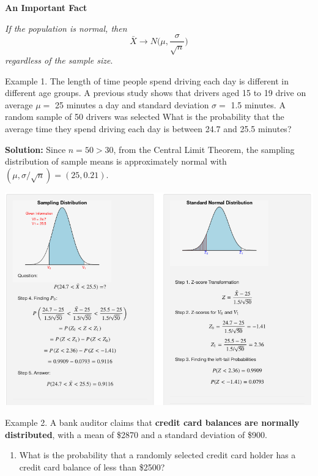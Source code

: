\documentclass[
]{book}
\providecommand{\tightlist}{%
  \setlength{\itemsep}{0pt}\setlength{\parskip}{0pt}}
\begin{document}
\hfill\break

\textbf{An Important Fact}

\emph{If the population is normal, then}
\[
\bar{X} \to N \big(\mu, \frac{\sigma}{\sqrt{n}} \big)
\]
\emph{regardless of the sample size}.

\hfill\break

Example 1. The length of time people spend driving each day is different in different age groups. A previous study shows that drivers aged 15 to 19 drive on average \(\mu =\) 25 minutes a day and standard deviation \(\sigma =\) 1.5 minutes. A random sample of 50 drivers was selected What is the probability that the average time they spend driving each day is between 24.7 and 25.5 minutes?

\textbf{Solution:} Since \(n = 50 > 30\), from the Central Limit Theorem, the sampling distribution of sample means is approximately normal with \((\mu, \sigma/\sqrt{n}) = (25, 0.21)\).

\begin{center}\includegraphics[width=1\linewidth]{week05/example01} \end{center}

\hfill\break

Example 2. A bank auditor claims that \textbf{credit card balances are normally distributed}, with a mean of \$2870 and a standard deviation of \$900.

\begin{enumerate}
\def\labelenumi{\arabic{enumi}.}
\tightlist
\item
  What is the probability that a randomly selected credit card holder has a credit card balance of less than \$2500?
\end{enumerate}
\end{document}
